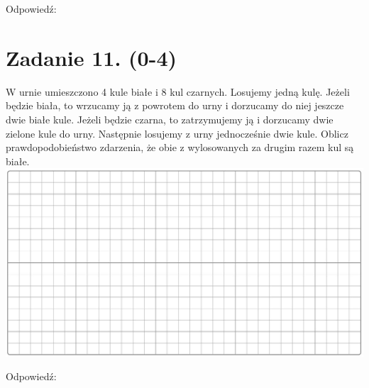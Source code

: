 \documentclass[10pt]{article}
\begin{document}
Odpowiedź:

\section*{Zadanie 11. (0-4)}
W urnie umieszczono 4 kule białe i 8 kul czarnych. Losujemy jedną kulę. Jeżeli będzie biała, to wrzucamy ją z powrotem do urny i dorzucamy do niej jeszcze dwie białe kule. Jeżeli będzie czarna, to zatrzymujemy ją i dorzucamy dwie zielone kule do urny. Następnie losujemy z urny jednocześnie dwie kule. Oblicz prawdopodobieństwo zdarzenia, że obie z wylosowanych za drugim razem kul są białe.\\
\includegraphics[max width=\textwidth, center]{2024_11_21_d15133c79177ee6989d3g-06}

Odpowiedź: \(\qquad\)
\end{document}
